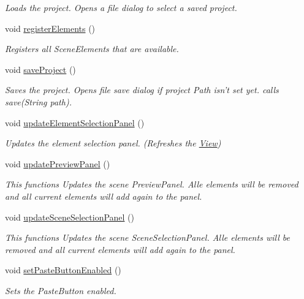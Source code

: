 \begin{DoxyCompactItemize}
\begin{DoxyCompactList}\small\item\em Loads the project. Opens a file dialog to select a saved project. \end{DoxyCompactList}\item 
void \hyperlink{class_a_rdev_kit_1_1_editor_window_a62e369fde3e6bf2d3980ff36256a74c1}{register\-Elements} ()
\begin{DoxyCompactList}\small\item\em Registers all Scene\-Elements that are available. \end{DoxyCompactList}\item 
void \hyperlink{class_a_rdev_kit_1_1_editor_window_a7ef9b2d88c9155f213bcc1b0476c4bb2}{save\-Project} ()
\begin{DoxyCompactList}\small\item\em Saves the project. Opens file save dialog if project Path isn't set yet. calls save(\-String path). \end{DoxyCompactList}\item 
void \hyperlink{class_a_rdev_kit_1_1_editor_window_ac2843e3145e7ef49d34dc4b104ff66d4}{update\-Element\-Selection\-Panel} ()
\begin{DoxyCompactList}\small\item\em Updates the element selection panel. (Refreshes the \hyperlink{namespace_a_rdev_kit_1_1_view}{View}) \end{DoxyCompactList}\item 
void \hyperlink{class_a_rdev_kit_1_1_editor_window_a82a2f39ebff57ea65f545b56859be05a}{update\-Preview\-Panel} ()
\begin{DoxyCompactList}\small\item\em This functions Updates the scene Preview\-Panel. Alle elements will be removed and all current elements will add again to the panel. \end{DoxyCompactList}\item 
void \hyperlink{class_a_rdev_kit_1_1_editor_window_abb065a00022ebb57eeb967d319554fc3}{update\-Scene\-Selection\-Panel} ()
\begin{DoxyCompactList}\small\item\em This functions Updates the scene Scene\-Selection\-Panel. Alle elements will be removed and all current elements will add again to the panel. \end{DoxyCompactList}\item 
void \hyperlink{class_a_rdev_kit_1_1_editor_window_a302d58e454127a9fb28eb3fa8b20cc5b}{set\-Paste\-Button\-Enabled} ()
\begin{DoxyCompactList}\small\item\em Sets the Paste\-Button enabled. \end{DoxyCompactList}\end{DoxyCompactItemize}
